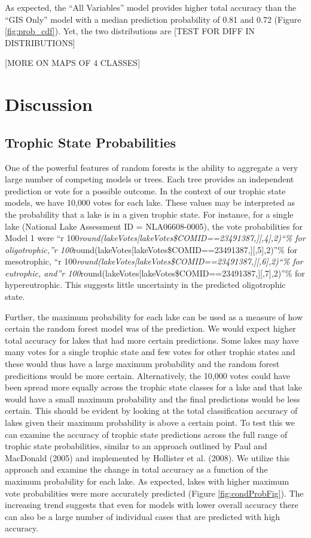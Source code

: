 \documentclass[11pt,]{article}
\begin{document}
As expected, the ``All Variables'' model provides higher total accuracy
than the ``GIS Only'' model with a median prediction probability of 0.81
and 0.72 (Figure \ref{fig:prob_cdf}). Yet, the two distributions are
{[}TEST FOR DIFF IN DISTRIBUTIONS{]}

{[}MORE ON MAPS OF 4 CLASSES{]}

\section{Discussion}\label{discussion}

\subsection{Trophic State
Probabilities}\label{trophic-state-probabilities}

One of the powerful features of random forests is the ability to
aggregate a very large number of competing models or trees. Each tree
provides an independent prediction or vote for a possible outcome. In
the context of our trophic state models, we have 10,000 votes for each
lake. These values may be interpreted as the probability that a lake is
in a given trophic state. For instance, for a single lake (National Lake
Assessment ID = NLA06608-0005), the vote probabilities for Model 1 were
``r
100\emph{round(lakeVotes{[}lakeVotes\$COMID==23491387,{]}{[},4{]},2)``\%
for oligotrophic,''r
100}round(lakeVotes{[}lakeVotes\$COMID==23491387,{]}{[},5{]},2)''\% for
mesotrophic, ``r
100\emph{round(lakeVotes{[}lakeVotes\$COMID==23491387,{]}{[},6{]},2)``\%
for eutrophic, and''r
100}round(lakeVotes{[}lakeVotes\$COMID==23491387,{]}{[},7{]},2)''\% for
hypereutrophic. This suggests little uncertainty in the predicted
oligotrophic state.

Further, the maximum probability for each lake can be used as a measure
of how certain the random forest model was of the prediction. We would
expect higher total accuracy for lakes that had more certain
predictions. Some lakes may have many votes for a single trophic state
and few votes for other trophic states and these would thus have a large
maximum probability and the random forest predicitions would be more
certain. Alternatively, the 10,000 votes could have been spread more
equally across the trophic state classes for a lake and that lake would
have a small maximum probability and the final predictions would be less
certain. This should be evident by looking at the total classification
accuracy of lakes given their maximum probability is above a certain
point. To test this we can examine the accuracy of trophic state
predictions across the full range of trophic state probabilities,
similar to an approach outlined by Paul and MacDonald (2005) and
implemented by Hollister et al. (2008). We utilize this approach and
examine the change in total accuracy as a function of the maximum
probability for each lake. As expected, lakes with higher maximum vote
probabilities were more accurately predicted (Figure
\ref{fig:condProbFig}). The increasing trend suggests that even for
models with lower overall accuracy there can also be a large number of
individual cases that are predicted with high accuracy.
\end{document}
